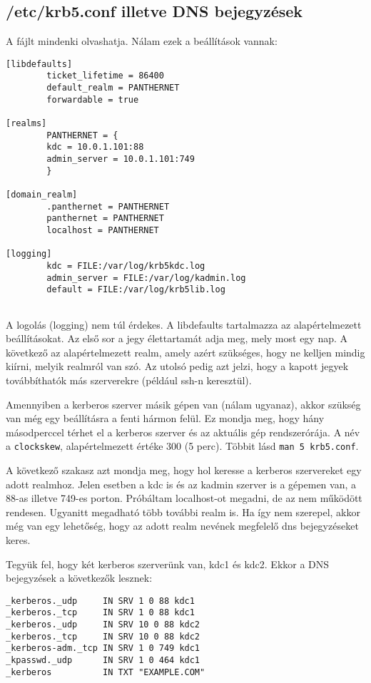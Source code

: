 \subsection{/etc/krb5.conf illetve DNS bejegyzések}
A fájlt mindenki olvashatja. Nálam ezek a beállítások vannak:


\begin{Verbatim}[frame=single,label=krb5.conf]
[libdefaults]
        ticket_lifetime = 86400
        default_realm = PANTHERNET
        forwardable = true

[realms]
        PANTHERNET = {
        kdc = 10.0.1.101:88
        admin_server = 10.0.1.101:749
        }

[domain_realm]
        .panthernet = PANTHERNET
        panthernet = PANTHERNET
        localhost = PANTHERNET

[logging]
        kdc = FILE:/var/log/krb5kdc.log
        admin_server = FILE:/var/log/kadmin.log
        default = FILE:/var/log/krb5lib.log


\end{Verbatim}

A logolás (logging) nem túl érdekes. A libdefaults tartalmazza az alapértelmezett beállításokat. Az első sor a jegy
élettartamát adja meg, mely most egy nap. A következő az alapértelmezett realm, amely azért szükséges, hogy ne kelljen
mindig kiírni, melyik realmról van szó. Az utolsó pedig azt jelzi, hogy a kapott jegyek továbbíthatók más szerverekre
(például ssh-n keresztül).

Amennyiben a kerberos szerver másik gépen van (nálam ugyanaz), akkor szükség van még egy beállításra a fenti hármon
felül. Ez mondja meg, hogy hány másodperccel térhet el a kerberos szerver és az aktuális gép rendszerórája. A név a
\texttt{clockskew}, alapértelmezett értéke 300 (5 perc). Többit lásd \texttt{man 5 krb5.conf}.

A következő szakasz azt mondja meg, hogy hol keresse a kerberos szervereket egy adott realmhoz. Jelen esetben a kdc is
és az kadmin szerver is a gépemen van, a 88-as illetve 749-es porton. Próbáltam localhost-ot megadni, de az nem
működött rendesen. Ugyanitt megadható több további realm is. Ha így nem szerepel, akkor még van egy lehetőség, hogy az
adott realm nevének megfelelő dns bejegyzéseket keres.

Tegyük fel, hogy két kerberos szerverünk van, kdc1 és kdc2. Ekkor a DNS bejegyzések a következők lesznek:

\begin{Verbatim}[frame=single,label=kerberos DNS bejegyzések]
_kerberos._udp     IN SRV 1 0 88 kdc1
_kerberos._tcp     IN SRV 1 0 88 kdc1
_kerberos._udp     IN SRV 10 0 88 kdc2
_kerberos._tcp     IN SRV 10 0 88 kdc2
_kerberos-adm._tcp IN SRV 1 0 749 kdc1
_kpasswd._udp      IN SRV 1 0 464 kdc1
_kerberos          IN TXT "EXAMPLE.COM"
\end{Verbatim}

